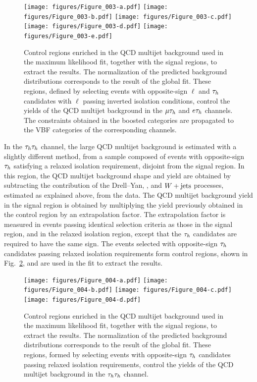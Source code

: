 \begin{figure}[!htbp]
\centering
     \texttt{[image: figures/Figure\_003-a.pdf]}
     \texttt{[image: figures/Figure\_003-b.pdf]}
     \texttt{[image: figures/Figure\_003-c.pdf]}
     \texttt{[image: figures/Figure\_003-d.pdf]}
     \texttt{[image: figures/Figure\_003-e.pdf]}
     \caption{Control regions enriched in the QCD multijet background used in the maximum likelihood fit, together with the signal regions, to extract the results. The normalization of the predicted background distributions corresponds to the result of the global fit. These regions, defined by selecting events with opposite-sign $\ell$ and $\tau_{h}$ candidates with $\ell$ passing inverted isolation conditions,  control the
yields of the QCD multijet background in the $\mu\tau_{h}$ and $e\tau_{h}$ channels.  The constraints obtained in the boosted categories are propagated to the VBF categories of the corresponding channels.}
     \label{fig:CR3}
\end{figure}

In the $\tau_{h}\tau_{h}$ channel, the large QCD multijet background is estimated with a slightly different method, from
a sample composed of events with opposite-sign $\tau_{h}$ satisfying a relaxed isolation requirement, disjoint from the signal region.
In this region, the QCD multijet background shape and yield are obtained
by subtracting the contribution of the
Drell--Yan, \ttbar, and $W+\text{jets}$ processes, estimated as explained above, from the data.
The QCD multijet background yield in the signal region is obtained by multiplying
the yield previously obtained in the control region by an extrapolation factor.
The extrapolation factor is measured in events passing identical selection criteria as those in the signal region, and in the relaxed
isolation region, except that the $\tau_{h}$ candidates are required to have the same sign.
The events selected with opposite-sign $\tau_{h}$ candidates passing relaxed isolation requirements form control regions, shown in Fig.~\ref{fig:CR4}, and are used in the fit to extract the results.

\begin{figure}[!htbp]
\centering
     \texttt{[image: figures/Figure\_004-a.pdf]}
     \texttt{[image: figures/Figure\_004-b.pdf]}
     \texttt{[image: figures/Figure\_004-c.pdf]}
     \texttt{[image: figures/Figure\_004-d.pdf]}
     \caption{Control regions enriched in the QCD multijet background used in the maximum likelihood fit, together with the signal regions, to extract the results. The normalization of the predicted background distributions corresponds to the result of the global fit. These regions, formed by selecting events with opposite-sign $\tau_{h}$ candidates passing relaxed isolation requirements, control the yields of the QCD multijet background in the $\tau_{h}\tau_{h}$ channel.}
     \label{fig:CR4}
\end{figure}

